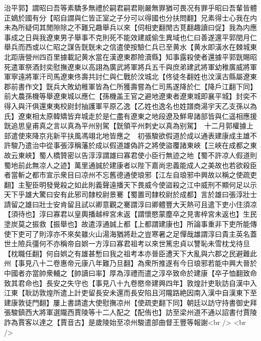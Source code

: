治平郭】謂昭曰吾等素驕多無禮於嗣君嗣君剛嚴無罪猶可畏况有罪乎昭曰吾輩皆體正嫡於國有分【昭自謂與仁皆正室之子分可以得國也分扶問翻】兄素得士心我在内未為所疑伺其閒隙除之不難兄趣舉兵以來【伺相吏翻閒古莧翻趣讀曰促】我為内應事成之日與我遼東男子舉事不克則死不能效建威偷生異域也仁曰善遂還平郭閏月仁舉兵而西或以仁昭之謀告皝皝未之信遣使按驗仁兵已至黄水【黄水即潢水在棘城東北距唐營州四百里據載記黄水當在漢遼東郡險瀆縣】知事露殺使者還據平郭皝賜昭死遣軍祭酒封奕慰撫遼東以高詡為廣武將軍將兵五千與庶弟建武將軍幼稚廣威將軍軍寧遠將軍汗司馬遼東佟壽共討仁與仁戰於汶城北【佟徒冬翻姓也汶漢古縣屬遼東郡前書作文】皝兵大敗幼稚軍皆為仁所獲壽嘗為仁司馬遂降於仁【降戶江翻下同】前大農孫機等舉遼東城以應仁【孫機盖王官之避地遼東者遼東城即襄平城】封奕不得入與汗俱還東夷校尉封抽護軍平原乙逸【乙姓也逸名也姓譜商湯宇天乙支孫以為氏】遼東相太原韓矯皆弃城走於是仁盡有遼東之地段遼及鮮卑諸部皆與仁遥相應援皝追思皇甫真之言以真為平州别駕【皝領平州刺史以真為别駕】　十二月郭權據上邽遣使來降京兆新平扶風馮翊北地皆應之　初張駿欲假道於成以通表建康成主雄不許駿乃遣治中從事張淳稱藩於成以假道雄偽許之將使盜覆諸東峽【三峽在成都之東故云東峽】蜀人橋贊密以告淳淳謂雄曰寡君使小臣行無迹之地【蜀不許凉人假道則蜀地前此無凉人之迹】萬里通誠於建康者以陛下嘉尚忠義能成人之美故也若欲殺臣者當斬之都市宣示衆目曰凉州不忘舊德通使琅邪【江左自琅邪中興故以稱之使疏吏翻】主聖臣明發覺殺之如此則義聲遠播天下畏威今使盜殺之江中威刑不顯何足以示天下乎雄大驚曰安有此邪司隸校尉景騫【蜀置司隸校尉於成都】言於雄曰張淳壯士請留之雄曰壯士安肯留且試以卿意觀之騫謂淳曰卿體豐大天熱可且遣下吏小住須凉【須待也】淳曰寡君以皇輿播越梓宮未返【謂懷愍蒙塵卒之見害梓宮未返也】生民塗炭莫之振救【振舉也】故遣淳通誠上都【上都謂建康也】所論事重非下吏所能傳使下吏可了則淳亦不來矣雖火山湯海猶將赴之豈寒暑之足憚哉雄謂淳曰貴主英名蓋世土險兵彊何不亦稱帝自娯一方淳曰寡君祖考以來世篤忠貞以讐恥未雪枕戈待旦【枕職任翻】何自娯之有雄甚慙曰我之祖考本亦晉臣遭天下大亂與六郡之民避難此州【事見八十二卷惠帝元康八年難乃旦翻】為衆所推遂有今日琅邪若能中興大晉於中國者亦當帥衆輔之【帥讀曰率】厚為淳禮而遣之淳卒致命於建康【卒子恤翻致命致其君命也】長安之失守也【事見八十九卷愍帝建興四年】敦煌計吏耿訪自漢中入江東【耿訪敦煌所遣上計吏留長安未還而長安陷且河隴路絶因南入漢中自漢東下至建康敦徒門翻】屢上書請遣大使慰撫凉州【使疏吏翻下同】朝廷以訪守持書御史拜張駿鎮西大將軍選隴西賈陵等十二人配之【配侑也】訪至梁州道不通以詔書付賈陵詐為賈客以達之【賈音古】是歲陵始至凉州駿遣部曲督王豐等報謝<br />
<br />

